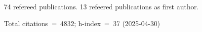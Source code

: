 74 refereed publications. 13 refeered publications as first author.

Total citations~=~4832; h-index~=~37 (2025-04-30)